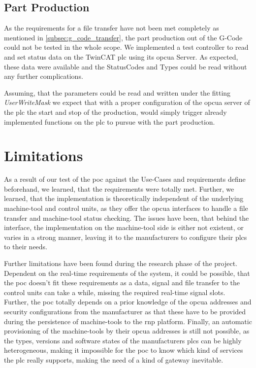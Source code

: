 \documentclass[
a4paper,
twoside,
headsepline,
cleardoublepage=empty,
parskip=half,
draft=false
]{scrbook}
\begin{document}
			\subsection{Part Production}\label{subsec:part_production}

				As the requirements for a file transfer have not been met completely as mentioned in \cref{subsec:g_code_transfer}, the part production out of the G-Code could not be tested in the whole scope. We implemented a test controller to read and set status data on the TwinCAT \gls{plc} using its \gls{opcua} Server. As expected, these data were available and the StatusCodes and Types could be read without any further complications.

				Assuming, that the parameters could be read and written under the fitting \textit{UserWriteMask} we expect that with a proper configuration of the \gls{opcua} server of the \gls{plc} the start and stop of the production, would simply trigger already implemented functions on the \gls{plc} to pursue with the part production.

		\section{Limitations}\label{sec:limitations}

			As a result of our test of the \gls{poc} against the Use-Cases and requirements define beforehand, we learned, that the requirements were totally met. Further, we learned, that the implementation is theoretically independent of the underlying machine-tool and control units, as they offer the \gls{opcua} interfaces to handle a file transfer and machine-tool status checking. The issues have been, that behind the interface, the implementation on the machine-tool side is either not existent, or varies in a strong manner, leaving it to the manufacturers to configure their \gls{plc}s to their needs.

			Further limitations have been found during the research phase of the project. Dependent on the real-time requirements of the system, it could be possible, that the \gls{poc} doesn't fit these requirements as a data, signal and file transfer to the control units can take a while, missing the required real-time signal slots. Further, the \gls{poc} totally depends on a prior knowledge of the \gls{opcua} addresses and security configurations from the manufacturer as that these have to be provided during the persistence of machine-tools to the \gls{rnp} platform. Finally, an automatic provisioning of the machine-tools by their \gls{opcua} addresses is still not possible, as the types, versions and software states of the manufacturers \gls{plc}s can be highly heterogeneous, making it impossible for the \gls{poc} to know which kind of services the \gls{plc} really supports, making the need of a kind of gateway inevitable.
\end{document}

